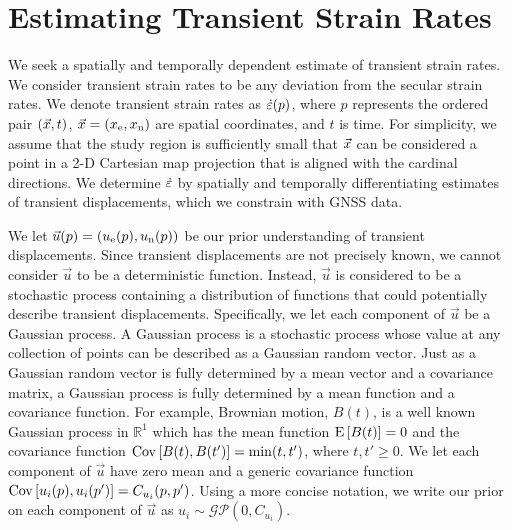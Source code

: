 \documentclass[extra,mreferee]{gji}
\begin{document}
\section{Estimating Transient Strain Rates}\label{sec:Method}


We seek a spatially and temporally dependent estimate of transient
strain rates. We consider transient strain rates to be any deviation
from the secular strain rates. We denote transient strain rates as
$\dot\varepsilon(p)$, where $p$ represents the ordered pair $(\vec{x},t)$, $\vec{x}
= (x_{\mathrm{e}},x_{\mathrm{n}})$ are spatial coordinates, and $t$ is time. For
simplicity, we assume that the study region is sufficiently small that
$\vec{x}$ can be considered a point in a 2-D Cartesian map projection
that is aligned with the cardinal directions. We determine $\dot\varepsilon$
by spatially and temporally differentiating estimates of transient
displacements, which we constrain with GNSS data.


We let $\vec{u}(p) = (u_{\mathrm{e}}(p),u_{\mathrm{n}}(p))$ be our prior understanding of
transient displacements. Since transient displacements are not
precisely known, we cannot consider $\vec{u}$ to be a deterministic
function. Instead, $\vec{u}$ is considered to be a stochastic process
containing a distribution of functions that could potentially describe
transient displacements. Specifically, we let each component of
$\vec{u}$ be a Gaussian process. A Gaussian process is a stochastic
process whose value at any collection of points can be described as a
Gaussian random vector. Just as a Gaussian random vector is fully
determined by a mean vector and a covariance matrix, a Gaussian
process is fully determined by a mean function and a covariance
function. For example, Brownian motion, $B(t)$, is a well known
Gaussian process in $\mathbb{R}^1$ which has the mean function
$\mathrm{E}\left[ B(t) \right] = 0$ and the covariance function $\mathrm{Cov}\left[ B(t),B(t') \right] =
\min(t,t')$, where $t,t' \ge 0$. We let each component of $\vec{u}$
have zero mean and a generic covariance function $\mathrm{Cov}\left[ u_i(p),u_i(p') \right]
= C_{u_i}(p,p')$. Using a more concise notation, we write our prior on
each component of $\vec{u}$ as $u_i \sim
\mathcal{GP}\left(0,C_{u_i}\right)$.

\end{document}
